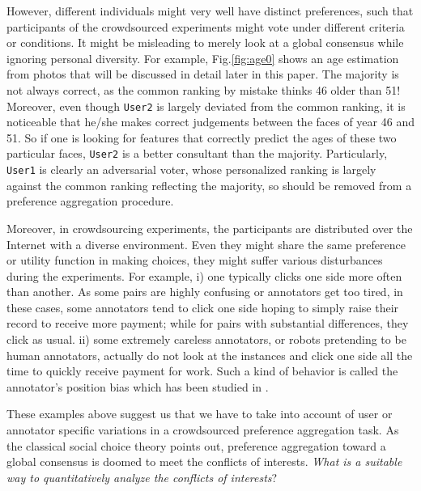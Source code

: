 \documentclass[10pt,journal,cspaper,compsoc]{IEEEtran}
\begin{document}
However, different individuals might very well have distinct preferences, such that participants of the crowdsourced experiments might vote under different criteria or conditions. It might be misleading to merely look at a global consensus while ignoring personal diversity. For example, Fig.\ref{fig:age0} shows an age estimation from photos that will be discussed in detail later in this paper. The majority is not always correct, as the common ranking by mistake thinks 46 older than 51! Moreover, even though {\tt User2} is largely deviated from the common ranking, it is noticeable that he/she makes correct judgements between the faces of year 46 and 51. So if one is looking for features that correctly predict the ages of these two particular faces, {\tt User2} is a better consultant than the majority. Particularly, {\tt User1} is clearly an adversarial voter, whose personalized ranking is largely against the common ranking reflecting the majority, so should be removed from a preference aggregation procedure.

Moreover, in crowdsourcing experiments, the participants are distributed over the Internet with a diverse environment. Even they might share the same preference or utility function in making choices, they might suffer various disturbances during the experiments. For example, i) one typically clicks one side more often than another. As some pairs are highly confusing or annotators get too tired, in these cases, some annotators tend to click one side hoping to simply raise their record to receive more payment; while for pairs with substantial differences, they click as usual. ii) some extremely careless annotators, or robots pretending to be human annotators, actually do not look at the instances and click one side all the time to quickly receive payment for work. Such a kind of behavior is called the annotator's position bias which has been studied in \cite{day1969position}.

These examples above suggest us that we have to take into account of user or annotator specific variations in a crowdsourced preference aggregation task.
As the classical social choice theory \cite{Arrow51} points out, preference aggregation toward a global consensus is doomed to meet the conflicts of interests. \emph{What is a suitable way to quantitatively analyze the conflicts of interests}?
\end{document}
